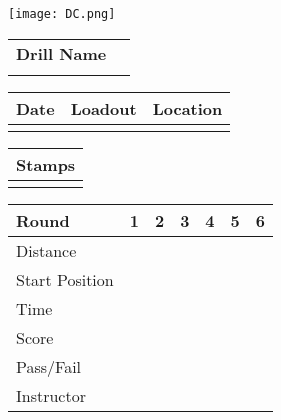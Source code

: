 \documentclass[../Cover.tex]{subfiles}
\begin{document}
\begin{minipage}[t][0.15\textheight][t]{0.15\textwidth} 
	\texttt{[image: DC.png]}
\end{minipage}
\hfill
\begin{minipage}[t][0.15\textheight][t]{0.8\textwidth}
	\begin{tabular}{ p{} l  }			
		\textbf{Drill Name} \\
		\\[0.09\textheight]
		\hline
	\end{tabular}
	\quad
	\begin{tabular}{ | p{} | p{} | p{} |}
		\hline
		Date & Loadout & Location\\ 
		\hline
		&  &  \\ 
		\hline
	\end{tabular}
\end{minipage}

\begin{tabular}{p{}|}
	Stamps \\
	\hline
	\\[5.5cm]
\end{tabular}
\quad
\begin{tabular}{ | p{} | p{} | p{} | p{} | p{} | p{} | p{} |}
	\hline
	Round & 1 & 2 & 3 & 4 & 5 & 6 \\
	\hline
	\tiny Distance & & & & & & \\[0.05\textheight]
	\hline
	\tiny Start Position & & & & & & \\[0.05\textheight]
	\hline
	\tiny Time & & & & & & \\[0.05\textheight]
	\hline
	\tiny Score & & & & & & \\[0.05\textheight]
	\hline
	\tiny Pass/Fail & & & & & & \\[0.05\textheight]
	\hline
	\tiny Instructor & & & & & & \\[0.05\textheight]
	\hline
\end{tabular}
\end{document}
